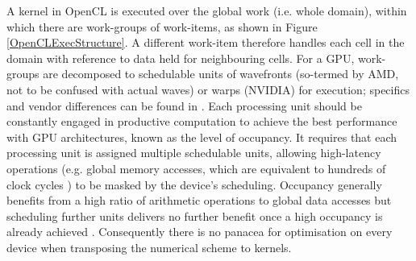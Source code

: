 A kernel in OpenCL is executed over the global work (i.e. whole domain), within which there are work-groups of work-items, as shown in Figure \ref{OpenCLExecStructure}. A different work-item therefore handles each cell in the domain with reference to data held for neighbouring cells. For a GPU, work-groups are decomposed to schedulable units of wavefronts (so-termed by AMD, not to be confused with actual waves) or warps (NVIDIA) for execution; specifics and vendor differences can be found in \citet{KhronosOpenCLWorkingGroup2012,NVIDIACorporation2010,AdvancedMicroDevicesInc2011}. Each processing unit should be constantly engaged in productive computation to achieve the best performance with GPU architectures, known as the level of occupancy. It requires that each processing unit is assigned multiple schedulable units, allowing high-latency operations (e.g. global memory accesses, which are equivalent to hundreds of clock cycles \citep{NVIDIACorporation2010}) to be masked by the device's scheduling. Occupancy generally benefits from a high ratio of arithmetic operations to global data accesses but scheduling further units delivers no further benefit once a high occupancy is already achieved \citep{AdvancedMicroDevicesInc2011}. Consequently there is no panacea for optimisation on every device when transposing the numerical scheme to kernels.

